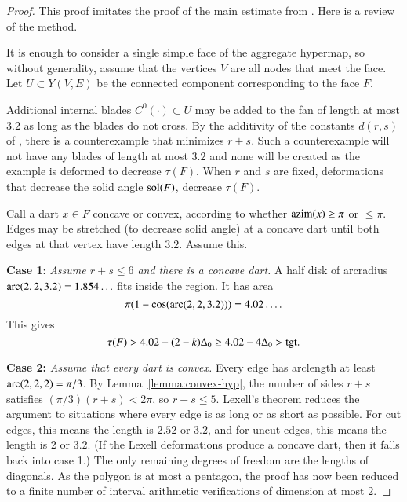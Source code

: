 \begin{proof} This proof imitates the proof of the main estimate from \cite{Hales:2006:DCG}.    Here is a review of the method.

It is enough to consider a single simple face of the aggregate hypermap, so without generality,   assume that the vertices $V$ are all nodes that meet the face.  Let $U\subset Y(V,E)$ be the connected component corresponding to the face $F$.

Additional internal blades $C^0(\cdot)\subset U$ may be added to the fan of length at most $3.2$ as long as the blades do not cross.  By the additivity of the constants $d(r,s)$ of , there is a counterexample that minimizes $r+s$.  Such a counterexample will not have any blades of length at most $3.2$ and none will be created as the example is deformed to decrease $\tau(F)$.  When $r$ and $s$ are fixed, deformations that decrease the solid angle $\operatorname{sol}(F)$, decrease $\tau(F)$.
%

Call a dart $x\in F$ concave or convex, according to whether ${\operatorname{azim}}(x)\ge\pi$ or $\le\pi$.  Edges may be stretched (to decrease solid angle) at a concave dart until both edges at that vertex have length $3.2$. Assume this.
%
%
%

{\bf Case 1}:
{\it Assume $r+s\le6$ and there is a concave dart.}  A half disk of arcradius $\operatorname{arc}(2,2,3.2)=1.854\ldots$ fits inside the region.  It has area
$$\pi(1-\cos(\operatorname{arc}(2,2,3.2)))=4.02\ldots.$$
This gives
$$\tau(F) > 4.02 + (2-k)\Delta_0 \ge 4.02 -4 \Delta_0 > {\operatorname{tgt}}.$$
%
%

{\bf Case 2:}
{\it Assume that every dart is convex.}
Every edge has arclength at least $\operatorname{arc}(2,2,2)=\pi/3$.  By Lemma~\ref{lemma:convex-hyp}, the number of sides $r+s$ satisfies $(\pi/3)(r+s) < 2\pi$, so $r+s\le5$.  Lexell's theorem reduces the argument to situations where every edge is as long or as short as possible.  For cut edges, this means the length is $2.52$ or $3.2$, and for uncut edges, this means the length is $2$ or $3.2$.  (If the Lexell deformations produce a concave dart, then it falls back into case 1.)  The only remaining degrees of freedom are the lengths of diagonals.  As the polygon is at most a pentagon, the proof has now been reduced to a finite number of interval arithmetic verifications of dimension at most $2$.
%


\end{proof}
